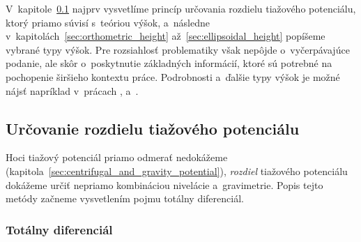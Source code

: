 \documentclass[a4paper, 12pt]{book}
\begin{document}
V~kapitole~\ref{sec:potential_differences} najprv vysvetlíme princíp určovania 
rozdielu tiažového potenciálu, ktorý priamo súvisí s~teóriou výšok, a~následne 
v~kapitolách~\ref{sec:orthometric_height} až~\ref{sec:ellipsoidal_height} 
popíšeme vybrané typy výšok.  Pre rozsiahlosť problematiky však nepôjde 
o~vyčerpávajúce podanie, ale skôr o~poskytnutie základných informácií, ktoré sú 
potrebné na pochopenie širšieho kontextu práce.  Podrobnosti a~ďalšie typy 
výšok je možné nájsť napríklad v~prácach \textcite{Jekeli2000a}, 
\textcite{MoritzPhysicalGeodesy} a~\textcite{SansoGeodeticHeights}.

\subsection{Určovanie rozdielu tiažového potenciálu}
\label{sec:potential_differences}

Hoci tiažový potenciál priamo odmerať nedokážeme 
(kapitola~\ref{sec:centrifugal_and_gravity_potential}), \emph{rozdiel} 
tiažového potenciálu dokážeme určiť nepriamo kombináciou nivelácie 
a~gravimetrie.  Popis tejto metódy začneme vysvetlením pojmu totálny 
diferenciál.

\subsubsection{Totálny diferenciál}
\label{sec:total_diferential}
\end{document}
